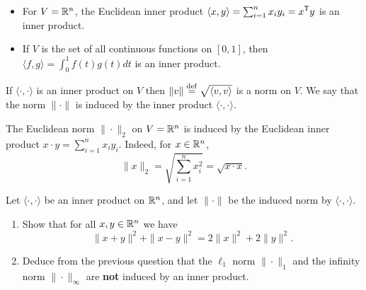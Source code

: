 \documentclass[11pt,nocut]{article}
\begin{document}
\begin{example}
	\leavevmode
	\begin{itemize}
		\item For $V = \mathbb{R}^n$, the Euclidean inner product $\langle x,y\rangle = \sum_{i=1}^n x_i y_i = x^{{\sf T}} y$ is an inner product.
		\item If $V$ is the set of all continuous functions on $[0,1]$, then $\langle f,g\rangle = \int_0^1 f(t) g(t) dt$ is an inner product.
	\end{itemize}
\end{example}

\begin{proposition}
	If $\langle \cdot, \cdot \rangle$ is an inner product on $V$ then $\| v \| \overset{\rm def}{=} \sqrt{\langle v, v \rangle}$ is a norm on $V$. We say  that the norm $\| \cdot \|$ is induced by the inner product $\langle \cdot, \cdot \rangle$.
\end{proposition}

\begin{remark}
	The Euclidean norm $\| \cdot \|_2$ on $V=\mathbb{R}^n$ is induced by the Euclidean inner product $x \cdot y = \sum_{i=1}^n x_i y_i$. Indeed, for $x \in \mathbb{R}^n$,
	$$
	\|x\|_2 = \sqrt{\sum_{i=1}^n x_i^2} = \sqrt{x \cdot x}.
	$$
\end{remark}
\begin{exercise}
	Let $\langle \cdot, \cdot \rangle$ be an inner product on $\mathbb{R}^n$, and let $\| \cdot \|$ be the induced norm by $\langle \cdot, \cdot \rangle$.
	\begin{enumerate}[label=\normalfont(\textbf{\alph*})]
		\item Show that for all $x,y \in \mathbb{R}^n$ we have
			$$
			\|x+y\|^2 + \|x-y\|^2 = 2 \|x\|^2 + 2 \|y\|^2.
			$$
		\item Deduce from the previous question that the $\ell_1$ norm $\| \cdot \|_1$ and the infinity norm $\| \cdot \|_{\infty}$ are \textbf{not} induced by an inner product.
	\end{enumerate}
\end{exercise}
\end{document}
